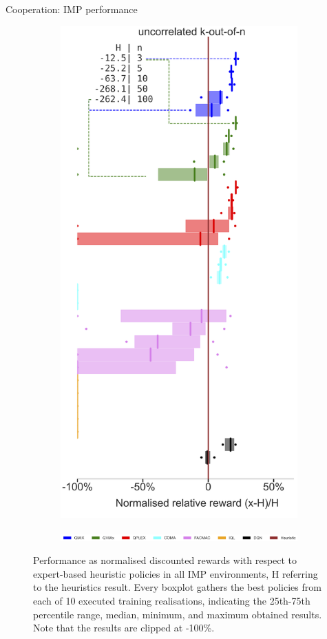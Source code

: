 \documentclass[9pt, hyperref={pdfusetitle,colorlinks=true,allcolors=DarkBlue}]{beamer}
\begin{document}
\begin{frame}{Cooperation: IMP performance}
\begin{figure}
\begin{subfigure}[t]{0.9\textwidth}
\centering
    \includegraphics[width=.3\linewidth]{boxplot_perc_limit_up_koutofn.png}
\end{subfigure}
%
\begin{subfigure}[t]{0.9\textwidth}
\centering
    \includegraphics[width=\linewidth]{box_plot_legend.png}
    \label{fig:env_categories_3}
\end{subfigure}
\caption{
Performance as normalised discounted rewards with respect to expert-based heuristic policies in all IMP environments, H referring to the heuristics result.
Every boxplot gathers the best policies from each of 10 executed training realisations, indicating the 25th-75th percentile range, median, minimum, and maximum obtained results.
Note that the results are clipped at -100\%.}
\end{figure}
\end{frame}
\end{document}
